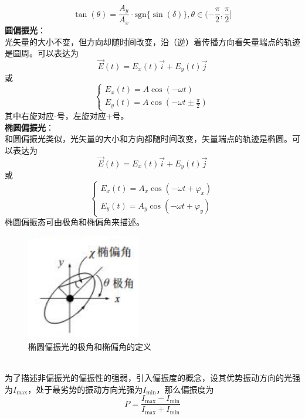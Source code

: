\documentclass{article}
\begin{document}
\[
\tan(\theta)=\frac{A_y}{A_x}\cdot\mathrm{sgn}\{\sin(\delta)\},\theta\in(-\frac{\pi}{2},\frac{\pi}{2}]
\]
\hspace*{2em}\textbf{圆偏振光}：\\
\hspace*{2em}光矢量的大小不变，但方向却随时间改变，沿（逆）着传播方向看矢量端点的轨迹是圆周。可以表达为
\[
\vec{E}(t)=E_x(t)\vec{i} + E_y(t)\vec{j}
\]
或
\[
\begin{cases}
E_x(t)=A\cos(-\omega t)\\
E_y(t)=A\cos\left(-\omega t\pm\frac{\pi}{2}\right)
\end{cases}
\]
\hspace*{2em}其中右旋对应-号，左旋对应+号。\\
\hspace*{2em}\textbf{椭圆偏振光}：\\
\hspace*{2em}和圆偏振光类似，光矢量的大小和方向都随时间改变，矢量端点的轨迹是椭圆。可以表达为
\[
\vec{E}(t)=E_x(t)\vec{i}+E_y(t)\vec{j}
\]
或
\[
\begin{cases}
E_x(t)=A_x\cos(-\omega t+\varphi_x)\\
E_y(t)=A_y\cos\left(-\omega t+\varphi_y\right)
\end{cases}
\]
\hspace*{2em}椭圆偏振态可由极角和椭偏角来描述。
\begin{figure}[ht]
    \centering
    \includegraphics[width=5cm]{1.2.png}
    \caption{椭圆偏振光的极角和椭偏角的定义}
\end{figure}\\
\hspace*{2em}为了描述非偏振光的偏振性的强弱，引入偏振度的概念，设其优势振动方向的光强为\(I_{\max}\)，处于最劣势的振动方向光强为\(I_{\min}\)，那么偏振度为
\[
P = \frac{I_{\max}-I_{\min}}{I_{\max}+I_{\min}}
\]
\end{document}
